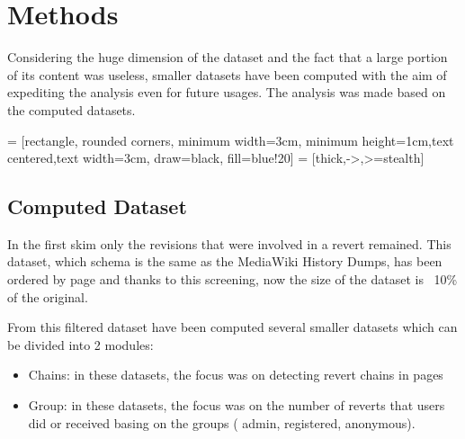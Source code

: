 \chapter{Methods}

Considering the huge dimension of the dataset and the fact that a large portion of its content was
useless, smaller datasets have been computed with the aim of expediting the analysis even for future
usages. The analysis was made based on the computed datasets. 

\bigskip



 = [rectangle, rounded corners, minimum width=3cm, minimum height=1cm,text centered,text width=3cm, draw=black, fill=blue!20]
 = [thick,->,>=stealth]


\bigskip

\section{Computed Dataset}
In the first skim only the revisions that were involved in a revert remained. This dataset, which
schema is the same as the MediaWiki History Dumps, has been ordered by page and thanks to this
screening, now the size of the dataset is ~10\% of the original. 

From this filtered dataset have been computed several smaller datasets which can be divided into 2 modules: 

\begin{itemize}
    \item Chains: in these datasets, the focus was on detecting revert chains in pages 
    \item Group: in these datasets, the focus was on the number of reverts that users did or received basing on the groups ( admin, registered, anonymous).
\end{itemize}

